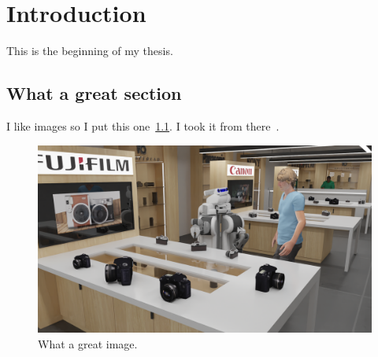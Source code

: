 
\ifdefined{}
\else
\setcounter{chapter}{0} %
\dominitoc
\faketableofcontents
\fi

\chapter{Introduction}
\minitoc

This is the beginning of my thesis.

\section{What a great section}

I like images so I put this one~\ref{fig:intro}. I took it from there~\cite{sarthou2021knowledge}.

\begin{figure}[h!]
\centering
\includegraphics[width=\textwidth]{figures/introduction/camera_store_2.png}
\caption{\label{fig:intro} What a great image. }
\end{figure}
